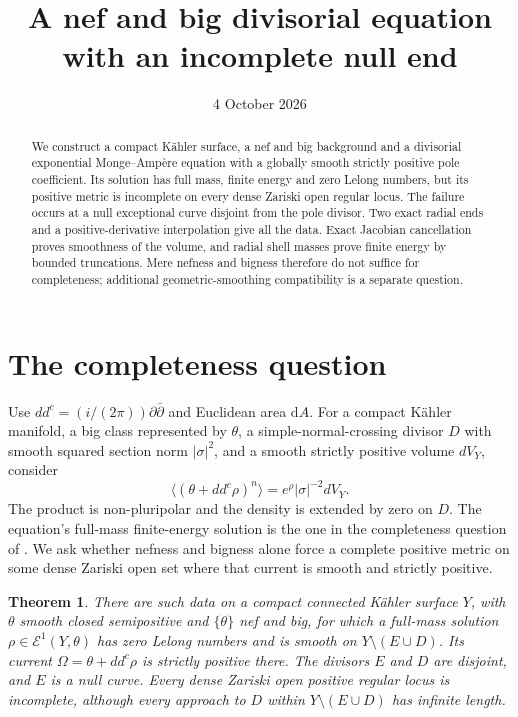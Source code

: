 \documentclass[11pt]{article}
\title{A nef and big divisorial equation with an incomplete null end}
\author{}
\date{4 October 2026}
\newtheorem{theorem}{Theorem}
\newcommand{\ddc}{dd^c}
\newcommand{\dA}{\mathrm dA}
\begin{document}
\maketitle
\begin{abstract}
We construct a compact K\"ahler surface, a nef and big background and a
divisorial exponential Monge--Amp\`ere equation with a globally smooth
strictly positive pole coefficient. Its solution has full mass, finite
energy and zero Lelong numbers, but its positive metric is incomplete on
every dense Zariski open regular locus. The failure occurs at a null
exceptional curve disjoint from the pole divisor. Two exact radial ends
and a positive-derivative interpolation give all the data. Exact Jacobian
cancellation proves smoothness of the volume, and radial shell masses
prove finite energy by bounded truncations. Mere nefness and bigness
therefore do not suffice for completeness; additional geometric-smoothing
compatibility is a separate question.
\end{abstract}

\section{The completeness question}
Use $\ddc=(i/(2\pi))\partial\bar\partial$ and Euclidean area $\dA$.
For a compact K\"ahler manifold, a big class represented by $\theta$,
a simple-normal-crossing divisor $D$ with smooth squared section norm
$|\sigma|^2$, and a smooth strictly positive volume $dV_Y$, consider
\begin{equation}\label{eq:equation}
 \langle(\theta+\ddc\rho)^n\rangle=e^\rho|\sigma|^{-2}dV_Y.
\end{equation}
The product is non-pluripolar and the density is extended by zero on $D$.
The equation's full-mass finite-energy solution is the one in the
completeness question of \cite[Section 3.1]{DGL}. We ask whether nefness
and bigness alone force a complete positive metric on some dense Zariski
open set where that current is smooth and strictly positive.

\begin{theorem}\label{thm:main}
There are such data on a compact connected K\"ahler surface $Y$, with
$\theta$ smooth closed semipositive and $\{\theta\}$ nef and big, for
which a full-mass solution $\rho\in\mathcal E^1(Y,\theta)$ has zero
Lelong numbers and is smooth on $Y\setminus(E\cup D)$. Its current
$\Omega=\theta+\ddc\rho$ is strictly positive there. The divisors
$E$ and $D$ are disjoint, and $E$ is a null curve. Every dense Zariski
open positive regular locus is incomplete, although every approach to
$D$ within $Y\setminus(E\cup D)$ has infinite length.
\end{theorem}
\end{document}
